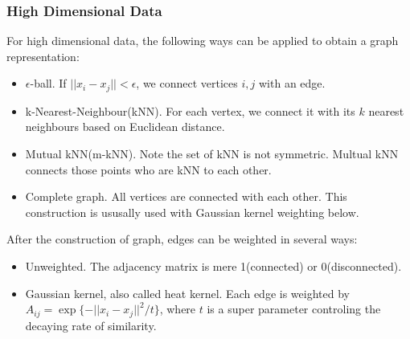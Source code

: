 
\subsubsection{High Dimensional Data}
\label{sec:metric_hdd}

For high dimensional data, the following ways can be 
applied to obtain a graph representation:
\begin{itemize}
	\item $\epsilon$-ball\cite{von2007tutorial}. If $||x_i-x_j|| < \epsilon$, we connect 
		vertices $i,j$ with an edge. 
	\item k-Nearest-Neighbour(kNN)\cite{von2007tutorial}. For each vertex, we connect 
		it with its $k$ nearest neighbours based on Euclidean distance. 
	\item Mutual kNN(m-kNN)\cite{von2007tutorial}. Note the set of kNN is not symmetric. 
		Multual kNN connects those points who are kNN to each other. 
	\item Complete graph\cite{von2007tutorial}. All vertices are connected with 
		each other. This construction is ususally used with Gaussian kernel 
		weighting below. 
\end{itemize}

After the construction of graph, edges can be weighted in several ways:
\begin{itemize}
	\item Unweighted\cite{belkin2003laplacian}. The adjacency matrix is 
		mere 1(connected) or 0(disconnected). 
	\item Gaussian kernel\cite{von2007tutorial}, also 
		called heat kernel\cite{belkin2003laplacian}. Each edge is weighted
		by $A_{ij} = \exp\{-||x_i-x_j||^2/t\}$, where $t$ is a super parameter
		controling the decaying rate of similarity. 
\end{itemize}

